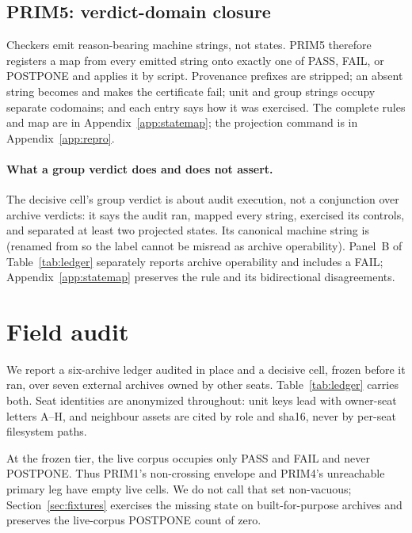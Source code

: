 \documentclass{article}
\begin{document}
\subsection{PRIM5: verdict-domain closure}
\label{sec:prim5}

Checkers emit reason-bearing machine strings, not states. PRIM5 therefore registers a map
from every emitted string onto exactly one of PASS, FAIL, or POSTPONE and applies it by
script. Provenance prefixes are stripped; an absent string becomes  and makes
the certificate fail; unit and group strings occupy separate codomains; and each entry says
how it was exercised. The complete rules and map are in Appendix~\ref{app:statemap}; the
projection command is in Appendix~\ref{app:repro}.

\paragraph{What a group verdict does and does not assert.}
The decisive cell's group verdict is about audit execution, not a conjunction over archive
verdicts: it says the audit ran, mapped every string, exercised its controls, and separated
at least two projected states. Its canonical machine string is
 (renamed from  so the label cannot be
misread as archive operability). Panel~B of Table~\ref{tab:ledger} separately reports archive
operability and includes a FAIL; Appendix~\ref{app:statemap} preserves the rule and its
bidirectional disagreements.

\section{Field audit}
\label{sec:results}

We report a six-archive ledger audited in place and a decisive cell, frozen before it ran,
over seven external archives owned by other seats. Table~\ref{tab:ledger} carries both.
Seat identities are anonymized throughout: unit keys lead with owner-seat letters A--H,
and neighbour assets are cited by role and sha16, never by per-seat filesystem paths.

At the frozen tier, the live corpus occupies only PASS and FAIL and never POSTPONE. Thus
PRIM1's non-crossing envelope and PRIM4's unreachable primary leg have empty live cells.
We do not call that set non-vacuous; Section~\ref{sec:fixtures} exercises the missing state
on built-for-purpose archives and preserves the live-corpus POSTPONE count of zero.
\end{document}

